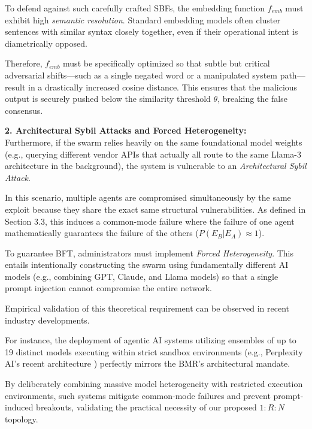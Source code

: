 \documentclass[a4paper,11pt,twocolumn]{article}
\theoremstyle{definition}
\theoremstyle{plain}
\begin{document}
To defend against such carefully crafted SBFs, the embedding function $f_{emb}$ must exhibit high \textit{semantic resolution}. Standard embedding models often cluster sentences with similar syntax closely together, even if their operational intent is diametrically opposed.

Therefore, $f_{emb}$ must be specifically optimized so that subtle but critical adversarial shifts---such as a single negated word or a manipulated system path---result in a drastically increased cosine distance.
This ensures that the malicious output is securely pushed below the similarity threshold $\theta$, breaking the false consensus.

\textbf{2. Architectural Sybil Attacks and Forced Heterogeneity:}\\
Furthermore, if the swarm relies heavily on the same foundational model weights (e.g., querying different vendor APIs that actually all route to the same Llama-3 architecture in the background), the system is vulnerable to an \textit{Architectural Sybil Attack}.

In this scenario, multiple agents are compromised simultaneously by the same exploit because they share the exact same structural vulnerabilities.
As defined in Section 3.3, this induces a common-mode failure where the failure of one agent mathematically guarantees the failure of the others ($P(E_B | E_A) \approx 1$). 


To guarantee BFT, administrators must implement \textit{Forced Heterogeneity}. This entails intentionally constructing the swarm using fundamentally different AI models (e.g., combining GPT, Claude, and Llama models) so that a single prompt injection cannot compromise the entire network.

Empirical validation of this theoretical requirement can be observed in recent industry developments.

\pagebreak

For instance, the deployment of agentic AI systems utilizing ensembles of up to 19 distinct models executing within strict sandbox environments (e.g., Perplexity AI's recent architecture \cite{heise2026perplexity}) perfectly mirrors the BMR's architectural mandate.

By deliberately combining massive model heterogeneity with restricted execution environments, such systems mitigate common-mode failures and prevent prompt-induced breakouts, validating the practical necessity of our proposed $1:R:N$ topology.
\end{document}
